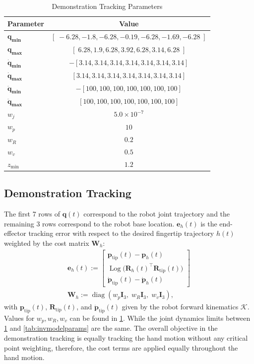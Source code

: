\documentclass[conference]{IEEEtran}
\begin{document}
\begin{table}[b]
\centering
\caption{Demonstration Tracking Parameters}
\label{tab:ikparams}
\begin{tabular}{l c}
\toprule
\textbf{Parameter} & \textbf{Value} \\
\midrule
$\mathbf{q_{\min}}$ & $[\;-6.28, -1.8, -6.28, -0.19, -6.28, -1.69, -6.28\;]$ \\
$\mathbf{q_{\max}}$ & $[\;6.28, 1.9, 6.28, 3.92, 6.28, 3.14, 6.28\;]$ \\
$\mathbf{\dot q_{\min}}$ & $-[3.14, 3.14, 3.14, 3.14, 3.14, 3.14, 3.14]$ \\
$\mathbf{\dot q_{\max}}$ & $[3.14, 3.14, 3.14, 3.14, 3.14, 3.14, 3.14]$ \\
$\mathbf{\ddot q_{\min}}$ & $-[100, 100, 100, 100, 100, 100, 100]$ \\
$\mathbf{\ddot q_{\max}}$ & $[100, 100, 100, 100, 100, 100, 100]$ \\
$w_j$ & $5.0 \times 10^{-7}$ \\
$w_p$ & $\;10\;$ \\
$w_R$ & $\;0.2\;$ \\
$w_v$ & $\;0.5\;$ \\
$z_{\min}$ & $\;1.2\;$ \\
\bottomrule
\end{tabular}
\end{table}
\subsection{Demonstration Tracking}
\label{sec:track_hand}
The first 7 rows of $\mathbf{q}(t)$ correspond to the robot joint trajectory and the remaining 3 rows correspond to the robot base location. $\mathbf{e}_h(t)$ is the end-effector tracking error with respect to the desired fingertip trajectory $h(t)$ weighted by the cost matrix $\mathbf{W}_h$:
\begin{align*}
\mathbf{e}_h(t) :=
\begin{bmatrix}
\mathbf{p}_{\mathrm{tip}}(t)-\mathbf{p}_h(t)\\
\operatorname{Log}\!\bigl(\mathbf{R}_h(t)^\top \mathbf{R}_{\mathrm{tip}}(t)\bigr)\\
\dot{\mathbf{p}}_{\mathrm{tip}}(t)-\dot{\mathbf{p}}_h(t)
\end{bmatrix}\\
\mathbf{W}_h := \operatorname{diag}(w_p\mathbf{I}_3,\;w_R\mathbf{I}_3,\;w_v\mathbf{I}_3),
\end{align*}
with $\mathbf{p}_{\mathrm{tip}}(t)$, $\mathbf{R}_{\mathrm{tip}}(t)$, and $\dot{\mathbf{p}}_{\mathrm{tip}}(t)$ given by the robot forward kinematics $\mathcal{K}$. Values for $w_p, w_R, w_v$ can be found in \cref{tab:ikparams}. While the joint dynamics limits between \cref{tab:ikparams} and \cref{tab:invmodelparams} are the same. The overall objective in the demonstration tracking is equally tracking the hand motion without any critical point weighting, therefore, the cost terms are applied equally throughout the hand motion.
\end{document}
